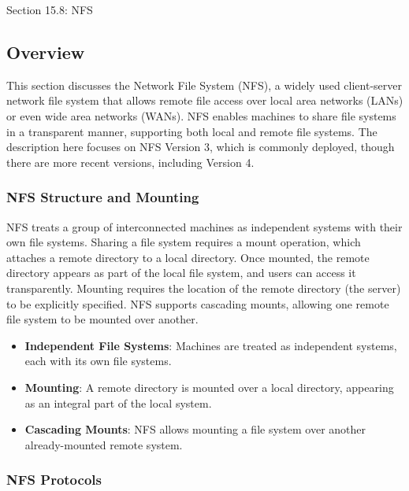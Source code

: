 \begin{notes}{Section 15.8: NFS}
    \subsection*{Overview}

    This section discusses the Network File System (NFS), a widely used client-server network file system that allows remote file access over local area networks (LANs) or even wide area networks (WANs). 
    NFS enables machines to share file systems in a transparent manner, supporting both local and remote file systems. The description here focuses on NFS Version 3, which is commonly deployed, though 
    there are more recent versions, including Version 4.
    
    \subsubsection*{NFS Structure and Mounting}
    
    NFS treats a group of interconnected machines as independent systems with their own file systems. Sharing a file system requires a mount operation, which attaches a remote directory to a local 
    directory. Once mounted, the remote directory appears as part of the local file system, and users can access it transparently. Mounting requires the location of the remote directory (the server) 
    to be explicitly specified. NFS supports cascading mounts, allowing one remote file system to be mounted over another.
    
    \begin{highlight}
    
        \begin{itemize}
            \item \textbf{Independent File Systems}: Machines are treated as independent systems, each with its own file systems.
            \item \textbf{Mounting}: A remote directory is mounted over a local directory, appearing as an integral part of the local system.
            \item \textbf{Cascading Mounts}: NFS allows mounting a file system over another already-mounted remote system.
        \end{itemize}
    
    \end{highlight}
    
    \subsubsection*{NFS Protocols}
    

\end{notes}

